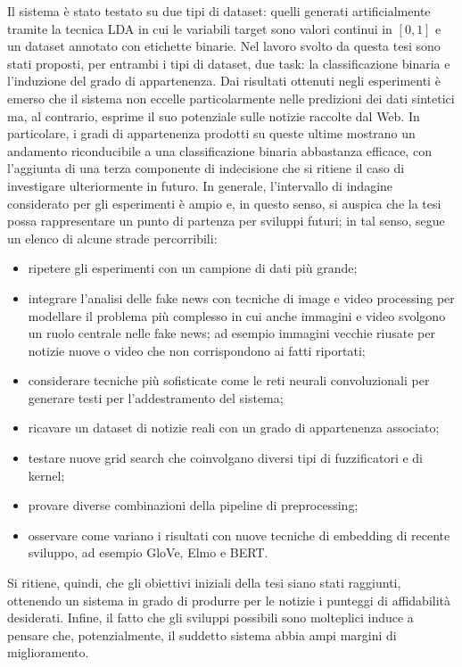 \documentclass[12pt]{report}
\theoremstyle{definition}
\begin{document}
Il sistema è stato testato su due tipi di dataset: quelli generati artificialmente tramite la tecnica LDA in cui le variabili target sono valori continui in $[0,1]$ e un dataset annotato con etichette binarie.
Nel lavoro svolto da questa tesi sono stati proposti, per entrambi i tipi di dataset, due task: la classificazione binaria e l'induzione del grado di appartenenza. Dai risultati ottenuti negli esperimenti è emerso che il sistema non eccelle particolarmente nelle predizioni dei dati sintetici ma, al contrario, esprime il suo potenziale sulle notizie raccolte dal Web. In particolare, i gradi di appartenenza prodotti su queste ultime mostrano un andamento riconducibile a una classificazione binaria abbastanza efficace, con l'aggiunta di una terza componente di indecisione che si ritiene il caso di investigare ulteriormente in futuro.
In generale, l'intervallo di indagine considerato per gli esperimenti è ampio e, in questo senso, si auspica che la tesi possa rappresentare un punto di partenza per sviluppi futuri; in tal senso, segue un elenco di alcune strade percorribili:
\begin{itemize}
    \item ripetere gli esperimenti con un campione di dati più grande;
    \item integrare l'analisi delle fake news con tecniche di image e video processing per modellare il problema più complesso in cui anche immagini e video svolgono un ruolo centrale nelle fake news; ad esempio immagini vecchie riusate per notizie nuove o video che non corrispondono ai fatti riportati;
    \item considerare tecniche più sofisticate come le reti neurali convoluzionali per generare testi per l'addestramento del sistema;
    \item ricavare un dataset di notizie reali con un grado di appartenenza associato;
    \item testare nuove grid search che coinvolgano diversi tipi di fuzzificatori e di kernel;
    \item provare diverse combinazioni della pipeline di preprocessing;
    \item osservare come variano i risultati con nuove tecniche di embedding di recente sviluppo, ad esempio GloVe, Elmo e BERT.
\end{itemize}

Si ritiene, quindi, che gli obiettivi iniziali della tesi siano stati raggiunti, ottenendo un sistema in grado di produrre per le notizie i punteggi di affidabilità desiderati.
Infine, il fatto che gli sviluppi possibili sono molteplici induce a pensare che, potenzialmente, il suddetto sistema abbia ampi margini di miglioramento.



\printbibliography

%
\end{document}
